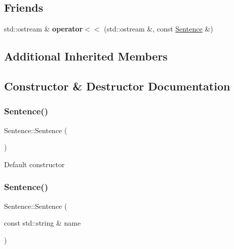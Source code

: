 \subsection*{Friends}
\begin{DoxyCompactItemize}
\item 
\mbox{\label{classSentence_ab4f19f42171de5744a04fed46ecbcc63}} 
std\+::ostream \& {\bfseries operator$<$$<$} (std\+::ostream \&, const \hyperlink{classSentence}{Sentence} \&)
\end{DoxyCompactItemize}
\subsection*{Additional Inherited Members}


\subsection{Constructor \& Destructor Documentation}
\mbox{\label{classSentence_aa767c3de8aaf7f2e30fa7524cdfcaead}} 
\subsubsection{\texorpdfstring{Sentence()}{Sentence()}\hspace{0.1cm}{\footnotesize\ttfamily [1/2]}}
{\footnotesize\ttfamily Sentence\+::\+Sentence (\begin{DoxyParamCaption}{ }\end{DoxyParamCaption})}

Default constructor \mbox{\label{classSentence_a92557fe647ad458e02749286b71f2586}} 
\subsubsection{\texorpdfstring{Sentence()}{Sentence()}\hspace{0.1cm}{\footnotesize\ttfamily [2/2]}}
{\footnotesize\ttfamily Sentence\+::\+Sentence (\begin{DoxyParamCaption}\item[{const std\+::string \&}]{name }\end{DoxyParamCaption})}

